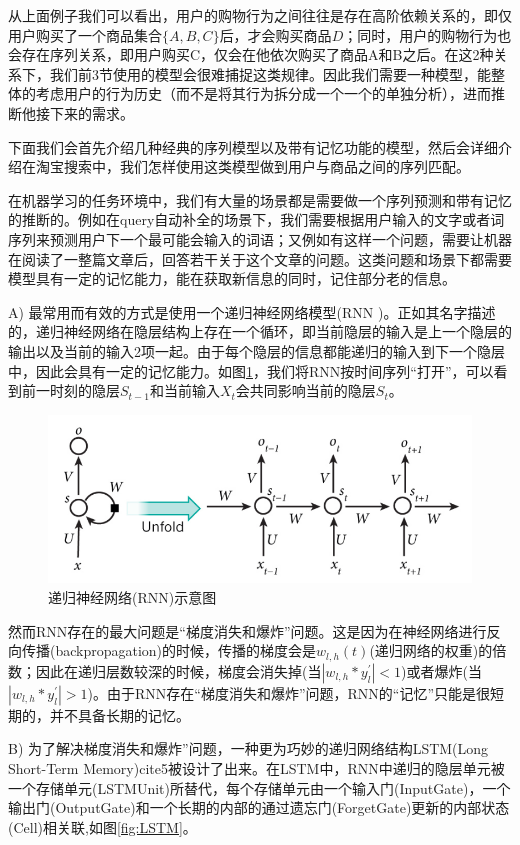 从上面例子我们可以看出，用户的购物行为之间往往是存在高阶依赖关系的，即仅用户购买了一个商品集合$\{A, B, C\}$后，才会购买商品$D$；同时，用户的购物行为也会存在序列关系，即用户购买C，仅会在他依次购买了商品A和B之后。在这2种关系下，我们前3节使用的模型会很难捕捉这类规律。因此我们需要一种模型，能整体的考虑用户的行为历史（而不是将其行为拆分成一个一个的单独分析），进而推断他接下来的需求。

下面我们会首先介绍几种经典的序列模型以及带有记忆功能的模型，然后会详细介绍在淘宝搜索中，我们怎样使用这类模型做到用户与商品之间的序列匹配。

在机器学习的任务环境中，我们有大量的场景都是需要做一个序列预测和带有记忆的推断的。例如在query自动补全的场景下，我们需要根据用户输入的文字或者词序列来预测用户下一个最可能会输入的词语；又例如有这样一个问题，需要让机器在阅读了一整篇文章后，回答若干关于这个文章的问题。这类问题和场景下都需要模型具有一定的记忆能力，能在获取新信息的同时，记住部分老的信息。

A) 最常用而有效的方式是使用一个递归神经网络模型(RNN \cite{4,5})。正如其名字描述的，递归神经网络在隐层结构上存在一个循环，即当前隐层的输入是上一个隐层的输出以及当前的输入2项一起。由于每个隐层的信息都能递归的输入到下一个隐层中，因此会具有一定的记忆能力。如图\ref{fig:RNN}，我们将RNN按时间序列“打开”，可以看到前一时刻的隐层$S_{t-1}$和当前输入$X_t$会共同影响当前的隐层$S_{t}$。

\begin{figure}[h]
	\centering
	\includegraphics[width=0.8\linewidth]{"fig/RNN"}
	\caption{递归神经网络(RNN)示意图}
	\label{fig:RNN}
\end{figure}	

然而RNN存在的最大问题是“梯度消失和爆炸”问题\cite{6}。这是因为在神经网络进行反向传播(backpropagation)的时候，传播的梯度会是$w_{l,h}(t)$(递归网络的权重)的倍数；因此在递归层数较深的时候，梯度会消失掉(当$|w_{l,h}*y^{'}_{l}|<1$)或者爆炸(当$|w_{l,h}*y^{'}_{l}|>1$)。由于RNN存在“梯度消失和爆炸”问题，RNN的“记忆”只能是很短期的，并不具备长期的记忆。

B) 为了解决梯度消失和爆炸”问题，一种更为巧妙的递归网络结构LSTM(Long Short-Term Memory)cite{5}被设计了出来。在LSTM中，RNN中递归的隐层单元被一个存储单元(LSTMUnit)所替代，每个存储单元由一个输入门(InputGate)，一个输出门(OutputGate)和一个长期的内部的通过遗忘门(ForgetGate)更新的内部状态(Cell)相关联,如图\ref{fig:LSTM}。

